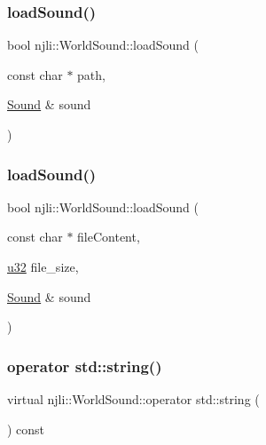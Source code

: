 \mbox{\label{classnjli_1_1_world_sound_a97885caaa2588661c1339788d8196d89}} 
\subsubsection{\texorpdfstring{load\+Sound()}{loadSound()}\hspace{0.1cm}{\footnotesize\ttfamily [1/2]}}
{\footnotesize\ttfamily bool njli\+::\+World\+Sound\+::load\+Sound (\begin{DoxyParamCaption}\item[{const char $\ast$}]{path,  }\item[{\mbox{\hyperlink{classnjli_1_1_sound}{Sound}} \&}]{sound }\end{DoxyParamCaption})}

\mbox{\label{classnjli_1_1_world_sound_a548876efce189ddf088d503e41d6e7f6}} 
\subsubsection{\texorpdfstring{load\+Sound()}{loadSound()}\hspace{0.1cm}{\footnotesize\ttfamily [2/2]}}
{\footnotesize\ttfamily bool njli\+::\+World\+Sound\+::load\+Sound (\begin{DoxyParamCaption}\item[{const char $\ast$}]{file\+Content,  }\item[{\mbox{\hyperlink{_util_8h_a10e94b422ef0c20dcdec20d31a1f5049}{u32}}}]{file\+\_\+size,  }\item[{\mbox{\hyperlink{classnjli_1_1_sound}{Sound}} \&}]{sound }\end{DoxyParamCaption})}

\mbox{\label{classnjli_1_1_world_sound_a13ce9a50994719130f8492017f82b887}} 
\subsubsection{\texorpdfstring{operator std\+::string()}{operator std::string()}}
{\footnotesize\ttfamily virtual njli\+::\+World\+Sound\+::operator std\+::string (\begin{DoxyParamCaption}{ }\end{DoxyParamCaption}) const\hspace{0.3cm}{\ttfamily [virtual]}}

